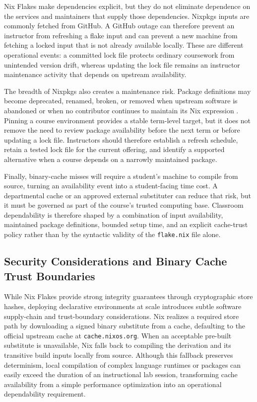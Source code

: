 Nix Flakes make dependencies explicit, but they do not eliminate dependence on
the services and maintainers that supply those dependencies. Nixpkgs inputs are commonly
fetched from GitHub. A GitHub outage can therefore prevent an instructor from
refreshing a flake input and can prevent a new machine from fetching a locked
input that is not already available locally. These are different operational events:
a committed lock file protects ordinary coursework from unintended version drift,
whereas updating the lock file remains an instructor maintenance activity that depends
on upstream availability.

The breadth of Nixpkgs also creates a maintenance risk. Package definitions may
become deprecated, renamed, broken, or removed when upstream software is abandoned
or when no contributor continues to maintain its Nix expression \cite{TrackingPackagesBe}.
Pinning a course environment provides a stable term-level target, but it does not
remove the need to review package availability before the next term or before updating
a lock file. Instructors should therefore establish a refresh schedule, retain a tested
lock file for the current offering, and identify a supported alternative when a
course depends on a narrowly maintained package.

Finally, binary-cache misses will require a student's machine to compile from source,
turning an availability event into a student-facing time cost. A departmental cache
or an approved external substituter can reduce that risk, but it must be
governed as part of the course's trusted computing base. Classroom dependability is
therefore shaped by a combination of input availability, maintained package
definitions, bounded setup time, and an explicit cache-trust policy rather than
by the syntactic validity of the \texttt{flake.nix} file alone.

\subsection{Security Considerations and Binary Cache Trust Boundaries}

While Nix Flakes provide strong integrity guarantees through cryptographic store
hashes, deploying declarative environments at scale introduces subtle software supply-chain
and trust-boundary considerations. Nix realizes a required store path by
downloading a signed binary substitute from a cache, defaulting to the official upstream
cache at \texttt{cache.nixos.org}. When an acceptable pre-built substitute is unavailable,
Nix falls back to compiling the derivation and its transitive build inputs
locally from source. Although this fallback preserves determinism, local
compilation of complex language runtimes or packages can easily exceed the
duration of an instructional lab session, transforming cache availability from a simple
performance optimization into an operational dependability requirement.


